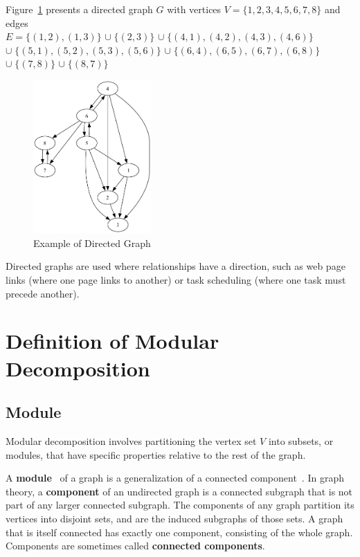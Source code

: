 \begin{myex}
    Figure~\ref{fig:example-directed-graph} presents a directed graph $G$ with vertices $V = \{1, 2, 3, 4, 5, 6, 7, 8\}$ and edges \\
    $E = \{(1, 2), (1, 3)\}$
    $\cup \; \{(2, 3)\}$
    $\cup \; \{(4 , 1), (4, 2), (4, 3), (4, 6)\}$
    $\cup \; \{(5 , 1), (5, 2), (5, 3), (5, 6)\}$
    $\cup \; \{(6, 4), (6, 5), (6, 7), (6, 8)\}$
    $\cup \; \{(7, 8)\}$
    $\cup \; \{(8, 7)\}$

    \begin{figure}[!h]
        \centering
        \includegraphics[width=0.40\textwidth]{images/graphs/digraph_ex1_without_label}
        \caption{Example of Directed Graph}
        \label{fig:example-directed-graph}
    \end{figure}
\end{myex}


Directed graphs are used where relationships have a direction, such as web page links (where one page links to another) or task scheduling (where one task must precede another).

\section{Definition of Modular Decomposition}\label{sec:definition-of-modular-decomposition}

\subsection*{Module}\label{subsec:module}

Modular decomposition involves partitioning the vertex set $V$ into subsets, or modules, that have specific properties relative to the rest of the graph.

A \textbf{module}~\cite{mdwikipedia} of a graph is a generalization of a connected component~\cite{componentwikipedia}.
In graph theory, a \textbf{component} of an undirected graph is a connected subgraph that is not part of any larger connected subgraph.
The components of any graph partition its vertices into disjoint sets, and are the induced subgraphs of those sets.
A graph that is itself connected has exactly one component, consisting of the whole graph.
Components are sometimes called \textbf{connected components}.

